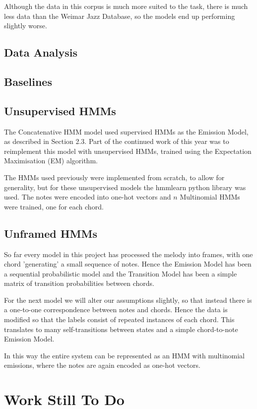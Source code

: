 \documentclass[bsc,logo,twoside,singlespacing,parskip,deptreport]{infthesis}
\begin{document}
Although the data in this corpus is much more suited to the task, there is much less data than the Weimar Jazz Database, so the models end up performing slightly worse. 
 
\subsection{Data Analysis}
\subsection{Baselines}
\subsection{Unsupervised HMMs}

The Concatenative HMM model used supervised HMMs as the Emission Model, as described in Section 2.3. Part of the continued work of this year was to reimplement this model with unsupervised HMMs, trained using the Expectation Maximisation (EM) algorithm. 

The HMMs used previously were implemented from scratch, to allow for generality, but for these unsupervised models the hmmlearn python library was used. The notes were encoded into one-hot vectors and $n$ Multinomial HMMs were trained, one for each chord.



\subsection{Unframed HMMs}

So far every model in this project has processed the melody into frames, with one chord 'generating' a small sequence of notes. Hence the Emission Model has been a sequential probabilistic model and the Transition Model has been a simple matrix of transition probabilities between chords.

For the next model we will alter our assumptions slightly, so that instead there is a one-to-one correspondence between notes and chords. Hence the data is modified so that the labels consist of repeated instances of each chord. This translates to many self-transitions between states and a simple chord-to-note Emission Model.

In this way the entire system can be represented as an HMM with multinomial emissions, where the notes are again encoded as one-hot vectors. 

\section{Work Still To Do}




\end{document}
